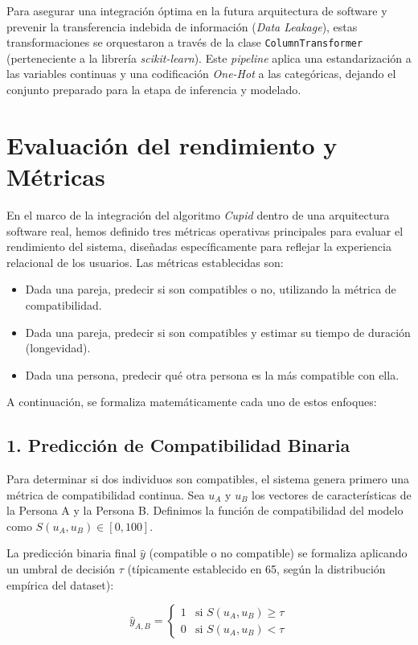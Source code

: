 Para asegurar una integración óptima en la futura arquitectura de software y prevenir la transferencia indebida de información (\textit{Data Leakage}), estas transformaciones se orquestaron a través de la clase \texttt{ColumnTransformer} (perteneciente a la librería \textit{scikit-learn}). Este \textit{pipeline} aplica una estandarización a las variables continuas y una codificación \textit{One-Hot} a las categóricas, dejando el conjunto preparado para la etapa de inferencia y modelado.

\section{Evaluación del rendimiento y Métricas}
\label{sec:evaluacion_metricas}
En el marco de la integración del algoritmo \textit{Cupid} dentro de una arquitectura software real, hemos definido tres métricas operativas principales para evaluar el rendimiento del sistema, diseñadas específicamente para reflejar la experiencia relacional de los usuarios. Las métricas establecidas son:

\begin{itemize}
    \item Dada una pareja, predecir si son compatibles o no, utilizando la métrica de compatibilidad.
    \item Dada una pareja, predecir si son compatibles y estimar su tiempo de duración (longevidad).
    \item Dada una persona, predecir qué otra persona es la más compatible con ella.
\end{itemize}

A continuación, se formaliza matemáticamente cada uno de estos enfoques:

\subsection{1. Predicción de Compatibilidad Binaria}
Para determinar si dos individuos son compatibles, el sistema genera primero una métrica de compatibilidad continua. Sea $u_A$ y $u_B$ los vectores de características de la Persona A y la Persona B. Definimos la función de compatibilidad del modelo como $S(u_A, u_B) \in [0, 100]$.

La predicción binaria final $\hat{y}$ (compatible o no compatible) se formaliza aplicando un umbral de decisión $\tau$ (típicamente establecido en 65, según la distribución empírica del dataset):

\begin{equation}
    \hat{y}_{A,B} = 
    \begin{cases} 
      1 & \text{si } S(u_A, u_B) \ge \tau \\
      0 & \text{si } S(u_A, u_B) < \tau
    \end{cases}
\end{equation}

